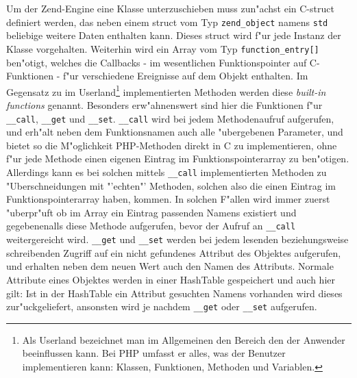 Um der Zend-Engine eine Klasse unterzuschieben muss zun"achst ein C-struct definiert werden, das neben einem struct vom Typ
\texttt{zend\_object} namens \texttt{std} beliebige weitere Daten enthalten kann. Dieses struct wird f"ur jede Instanz der Klasse
vorgehalten. Weiterhin wird ein Array vom Typ \texttt{function\_entry[]} ben"otigt, welches die Callbacks - im wesentlichen Funktionspointer
auf C-Funktionen - f"ur verschiedene Ereignisse auf dem Objekt enthalten. Im Gegensatz zu im Userland\footnote{
Als Userland bezeichnet man im Allgemeinen den Bereich den der Anwender beeinflussen kann. Bei PHP umfasst er alles, was der Benutzer
implementieren kann: Klassen, Funktionen, Methoden und Variablen.
} implementierten
Methoden werden diese \emph{built-in functions} genannt.
Besonders erw"ahnenswert sind hier die Funktionen f"ur 
\texttt{\_\_call}, \texttt{\_\_get} und \texttt{\_\_set}. \texttt{\_\_call} wird bei jedem Methodenaufruf aufgerufen, und erh"alt neben dem
Funktionsnamen auch alle "ubergebenen Parameter, und bietet so die M"oglichkeit PHP-Methoden direkt in C zu implementieren, ohne f"ur jede
Methode einen eigenen Eintrag im Funktionspointerarray zu ben"otigen. Allerdings kann es bei solchen mittels \texttt{\_\_call} implementierten
Methoden zu "Uberschneidungen mit "'echten"' Methoden, solchen also die einen Eintrag im Funktionspointerarray haben, kommen. In solchen
F"allen wird immer zuerst "uberpr"uft ob im Array ein Eintrag passenden Namens existiert und gegebenenalls diese Methode aufgerufen, bevor
der Aufruf an  \texttt{\_\_call} weitergereicht wird.
\texttt{\_\_get} und \texttt{\_\_set} werden bei jedem lesenden beziehungsweise schreibenden Zugriff auf ein nicht gefundenes Attribut des
Objektes aufgerufen, und erhalten neben dem neuen Wert auch den Namen des Attributs. Normale Attribute eines Objektes werden in einer
HashTable gespeichert und auch hier gilt: Ist in der HashTable ein Attribut gesuchten Namens vorhanden wird dieses zur"uckgeliefert,
ansonsten wird je nachdem \texttt{\_\_get} oder \texttt{\_\_set} aufgerufen.


